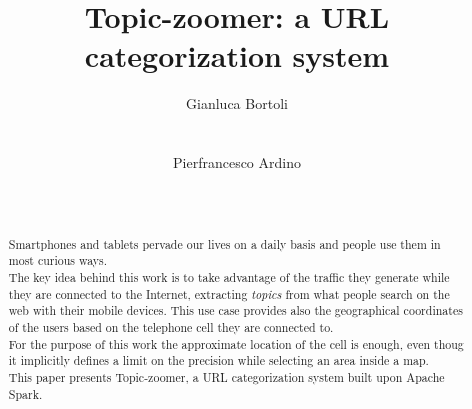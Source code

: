\documentclass{sig-alternate-05-2015}
\begin{document}
\title{Topic-zoomer: a URL categorization system}

\author{
    \alignauthor
    Gianluca Bortoli\\
           \\
           \\
    \alignauthor
    Pierfrancesco Ardino\\
           \\
           \\
    }
\maketitle


\begin{abstract}
Smartphones and tablets pervade our lives on a daily basis and people use them in most curious ways.\\ 
The key idea behind this work is to take advantage of the traffic they generate while they are connected to the Internet, extracting \emph{topics} from what people search on the web with their mobile devices. This use case provides also the geographical coordinates of the users based on the telephone cell they are connected to.\\
For the purpose of this work the approximate location of the cell is enough, even thoug it implicitly defines a limit on the precision while selecting an area inside a map.\\
This paper presents Topic-zoomer, a URL categorization system built upon Apache Spark.
\end{abstract}


\printccsdesc
{}
\end{document}
